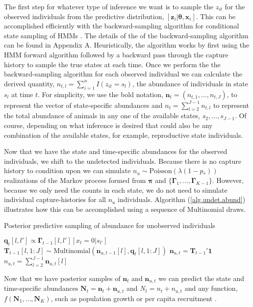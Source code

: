 \documentclass[12pt]{article}
\newcommand{\bx}{\ensuremath{\mathbf{x}}}
\newcommand{\bn}{\ensuremath{\mathbf{n}}}
\newcommand{\bz}{\ensuremath{\mathbf{z}}}
\newcommand{\bN}{\ensuremath{\mathbf{N}}}
\newcommand{\bT}{\ensuremath{\mathbf{T}}}
\newcommand{\bpi}{\ensuremath{\boldsymbol{\pi}}}
\newcommand{\bG}{\ensuremath{\boldsymbol{\Gamma}}}
\newcommand{\bt}{\ensuremath{\boldsymbol{\theta}}}
\begin{document}
The first step for whatever type of inference we want is to sample the $z_{it}$ for the observed individuals from the predictive distribution, $[\bz_{i}| \bt, \bx_i]$. This can be accomplished efficiently with the backward-sampling algorithm for conditional state sampling of HMMs \citep{scott2002bayesian}. The details of the of the backward-sampling algorithm can be found in Appendix A. Heuristically, the algorithm works by first using the HMM forward algorithm \citep{xxx} followed by a backward pass through the capture history to sample the true states at each time. Once we perform the the backward-sampling algorithm for each observed individual we can calculate the derived quantity, $n_{t,l} = \sum_{i=1}^n I(z_{it}=s_l)$, the abundance of individuals in state $s_l$ at time $t$. For simplicity, we use the bold notation, $\bn_t = (n_{t,1},\dots,n_{t,J})$, to represent the vector of state-specific abundances and $n_t = \sum_{l=2}^{J-1} n_{t,l}$ to represent the total abundance of animals in any one of the available states, $s_2,\dots,s_{J-1}$. Of course, depending on what inference is desired that could also be any combination of the available states, for example, reproductive state individuals.    

Now that we have the state and time-specific abundances for the observed individuals, we shift to the undetected individuals. Because there is no capture history to condition upon we can simulate $n_u \sim \text{Poisson}(\lambda(1-p_*))$ realizations of the Markov process formed from $\bpi$ and $\{\bG_1,\dots,\bG_{K-1}\}$. However, because we only need the counts in each state, we do not need to simulate individual capture-histories for all $n_u$ individuals. Algorithm (\ref{alg.undet.abund}) illustrates how this can be accomplished using a sequence of Multinomial draws. 
\begin{algorithm}
\label{alg.undet.abund}
\caption{Posterior predictive sampling of abundance for unobserved individuals}
\begin{algorithmic}[1]
\STATE{$\bn_{u,1} \sim \text{Multinomial}(n_u, \bpi_0)$} 
		\STATE $\mathbf{q}_{t}[l,l'] \propto \bG_{t-1}[l,l'][x_t=0|s_{l'}]$
		\STATE $\bT_{t-1}[l,1\!:\!J] \sim \text{Multinomial}(\bn_{u,t-1}[l], \mathbf{q}_{t}[l,1\!:\!J])$
    \ENDFOR
    \STATE $\bn_{u,t} = \bT_{t-1}'\mathbf{1}$
    \STATE $n_{u,t} = \sum_{l=2}^{J-1} \bn_{u,t}[l]$
\ENDFOR
\end{algorithmic}
\end{algorithm}
Now that we have posterior samples of $\bn_t$ and $\bn_{u,t}$ we can predict the state and time-specific abundances $\bN_t =  \bn_t + \bn_{u,t}$ and $N_t =  n_t + n_{u,t}$ and any function, $f(\bN_1,\dots,\bN_K)$, such as population growth or per capita recruitment \citep{schwarz2001jolly}. 
\end{document}
